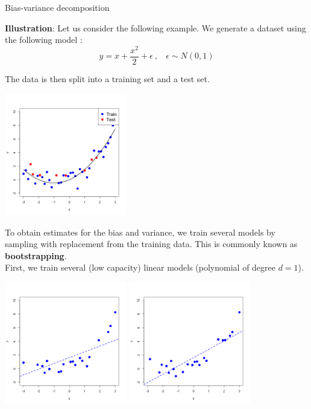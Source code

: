 \documentclass[11pt,compress,t,notes=noshow, xcolor=table]{beamer}
\begin{document}
\begin{vbframe} {Bias-variance decomposition}



\framebreak

\textbf{Illustration}: Let us consider the following example. We generate a dataset using the following model : 
$$y = x + \frac{x^2}{2} + \epsilon  \ , \ \ \ \ \epsilon \sim 
N (0, 1)$$

The data is then split into a training set and a test set.

\begin{center}
  \includegraphics[width = 0.4\textwidth]{figure/bias_variance_decomposition-train_test.png}
\end{center}

\framebreak

To obtain estimates for the bias and variance, we train several models by sampling with replacement from the training data. This is commonly known as \textbf{bootstrapping}. \\
\vspace{0.3cm}
First, we train several (low capacity) linear models (polynomial of degree $d=1$).

\begin{center}
  \includegraphics[width = 0.4\textwidth]{figure/bias_variance_decomposition-bootstrap_1.png}
  \includegraphics[width = 0.4\textwidth]{figure/bias_variance_decomposition-bootstrap_2.png}
\end{center}


\end{vbframe}
\end{document}
